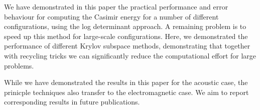 We have demonstrated in this paper the practical performance and error behaviour for computing the Casimir energy for a number of different configurations, using the log determinant approach. A remaining problem is to speed up this method for large-scale configurations. Here, we demonstrated the performance of different Krylov subspace methods, demonstrating that together with recycling tricks we can significantly reduce the computational effort for large problems.

While we have demonstrated the results in this paper for the acoustic case, the prinicple techniques also transfer to the electromagnetic case. We aim to report corresponding results in future publications.